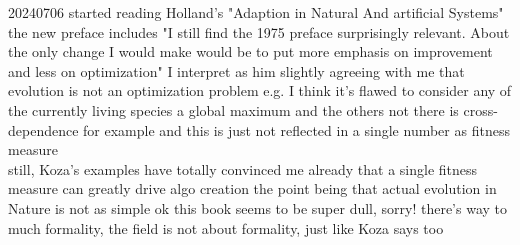 \documentclass{article}\usepackage[margin=2cm]{geometry}
\begin{document}
\begin{cascade}
    20240706
    \stepin
    started reading Holland's "Adaption in Natural And artificial Systems"
    \stepin
    the new preface includes "I still find the 1975 preface surprisingly relevant. About the only change I would make would be to put more emphasis on improvement and less on optimization"
    \stepin
    I interpret as him slightly agreeing with me that evolution is not an optimization problem
    \stepin
    e.g. I think it's flawed to consider any of the currently living species a global maximum and the others not
    \stepin
    there is cross-dependence for example and this is just not reflected in a single number as fitness measure\\
    still, Koza's examples have totally convinced me already that a single fitness measure can greatly drive algo creation
    \stepin
    the point being that actual evolution in Nature is not as simple
    \stepout
    \stepout
    \stepout
    \stepout
    ok this book seems to be super dull, sorry!
    \stepin
    there's way to much formality, the field is not about formality, just like Koza says too
\end{cascade}
\end{document}
